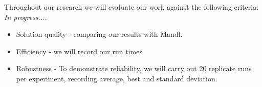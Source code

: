 Throughout our research we will evaluate our work against the following criteria: \textit{In progress....}
\begin{itemize}
\item Solution quality - comparing our results with Mandl.
\item Efficiency - we will record our run times
\item Robustness - To demonstrate reliability, we will carry out 20 replicate runs per experiment, recording average, best and standard deviation. 
\end{itemize}


